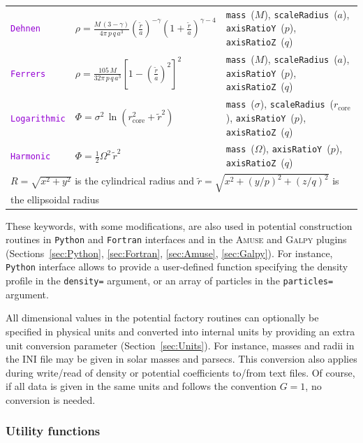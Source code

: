 \documentclass[12pt]{article}
\newcommand{\Amuse}{\textsc{Amuse}\xspace}
\newcommand{\Galpy}{\textsc{Galpy}\xspace}
\newcommand{\Python}{\texttt{Python}\xspace}
\newcommand{\Fortran}{\texttt{Fortran}\xspace}
\newcommand{\ttt}[1]{\textcolor{darkviolet}{\texttt{#1}}}
\newcommand{\ppp}[1]{\textcolor{darkolive} {\texttt{#1}}}
\begin{document}
\begin{table}
\begin{tabular}{l m{5cm} >{\raggedright\arraybackslash}m{6cm}}
\ttt{Dehnen} & $\rho = \frac{M\,(3-\gamma)}{4\pi\,p\,q\,a^3} \left(\frac{\tilde r}a\right)^{-\gamma} \left(1+\frac{\tilde r}a\right)^{\gamma-4}$\!\! &  \ppp{mass}~($M$), \ppp{scaleRadius}~($a$), \ppp{axisRatioY}~($p$), \ppp{axisRatioZ}~($q$) \\[2mm]
\ttt{Ferrers} & $\rho = \frac{105\,M}{32\pi\,p\,q\,a^3} \left[1 - \left(\frac{\tilde r}a\right)^2\right]^2$ & \ppp{mass}~($M$), \ppp{scaleRadius}~($a$), \ppp{axisRatioY}~($p$), \ppp{axisRatioZ}~($q$) \\[2mm]
\ttt{Logarithmic} & $\Phi = \sigma^2\,\ln(r_\mathrm{core}^2 + \tilde r^2)$ & \ppp{mass}~($\sigma$), \ppp{scaleRadius}~($r_\mathrm{core}$), \ppp{axisRatioY}~($p$), \ppp{axisRatioZ}~($q$) \\[2mm]
\ttt{Harmonic} & $\Phi = \frac{1}{2} \Omega^2\,\tilde r^2$ & \ppp{mass}~($\Omega$), \ppp{axisRatioY}~($p$), \ppp{axisRatioZ}~($q$) \\[2mm]
\multicolumn{3}{l}{\footnotesize $R=\sqrt{x^2+y^2}$ is the cylindrical radius and $\tilde r=\sqrt{x^2+(y/p)^2+(z/q)^2}$ is the ellipsoidal radius}
\end{tabular}
\end{table}

These keywords, with some modifications, are also used in potential construction routines in \Python and \Fortran interfaces and in the \Amuse and \Galpy plugins (Sections~\ref{sec:Python}, \ref{sec:Fortran}, \ref{sec:Amuse}, \ref{sec:Galpy}). For instance, \Python interface allows to provide a user-defined function specifying the density profile in the \ppp{density=} argument, or an array of particles in the \ppp{particles=} argument.

All dimensional values in the potential factory routines can optionally be specified in physical units and converted into internal units by providing an extra unit conversion parameter (Section~\ref{sec:Units}). For instance, masses and radii in the INI file may be given in solar masses and parsecs. This conversion also applies during write/read of density or potential coefficients to/from text files. Of course, if all data is given in the same units and follows the convention $G=1$, no conversion is needed.

\subsubsection{Utility functions}  \label{sec:PotentialUtility}
\end{document}

